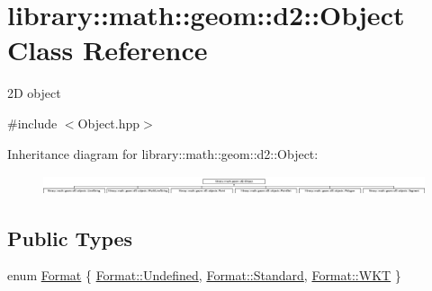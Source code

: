 \hypertarget{classlibrary_1_1math_1_1geom_1_1d2_1_1_object}{}\section{library\+:\+:math\+:\+:geom\+:\+:d2\+:\+:Object Class Reference}
\label{classlibrary_1_1math_1_1geom_1_1d2_1_1_object}


2D object  




{\ttfamily \#include $<$Object.\+hpp$>$}

Inheritance diagram for library\+:\+:math\+:\+:geom\+:\+:d2\+:\+:Object\+:\begin{figure}[H]
\begin{center}
\leavevmode
\includegraphics[height=0.569395cm]{classlibrary_1_1math_1_1geom_1_1d2_1_1_object}
\end{center}
\end{figure}
\subsection*{Public Types}
\begin{DoxyCompactItemize}
\item 
enum \hyperlink{classlibrary_1_1math_1_1geom_1_1d2_1_1_object_ac8cd61dada4960cfee9a469231621b17}{Format} \{ \hyperlink{classlibrary_1_1math_1_1geom_1_1d2_1_1_object_ac8cd61dada4960cfee9a469231621b17aec0fc0100c4fc1ce4eea230c3dc10360}{Format\+::\+Undefined}, 
\hyperlink{classlibrary_1_1math_1_1geom_1_1d2_1_1_object_ac8cd61dada4960cfee9a469231621b17aeb6d8ae6f20283755b339c0dc273988b}{Format\+::\+Standard}, 
\hyperlink{classlibrary_1_1math_1_1geom_1_1d2_1_1_object_ac8cd61dada4960cfee9a469231621b17a9ab05752e6beff2c783a6046ed592661}{Format\+::\+W\+KT}
 \}
\end{DoxyCompactItemize}
